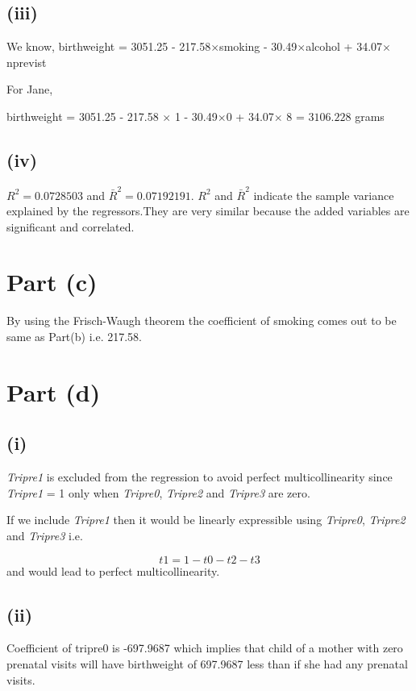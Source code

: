\documentclass{./solution}
\begin{document}
\begin{solution}
            \subsection*{(iii)}
            We know,
            birthweight = 3051.25 - 217.58$\times$smoking - 30.49$\times$alcohol  + 34.07$\times$nprevist

            For Jane,

            birthweight = 3051.25 - 217.58 $\times$ 1 - 30.49$\times$0  + 34.07$\times$ 8 = $3106.228 $ grams

            \subsection*{(iv)}
            $R^{2} = 0.0728503$ and $\bar{R}^{2}=0.07192191$.
            $R^{2}$ and $\bar{R}^{2}$  indicate the sample variance explained
            by the regressors.They are very similar because the added variables
            are significant and correlated.

        \section*{Part (c)}
            By using the Frisch-Waugh theorem the coefficient of smoking comes out to be same as Part(b) i.e. 217.58.

        \section*{Part (d)}
            \subsection*{(i)}
            \textit{Tripre1} is excluded from the regression to avoid perfect
            multicollinearity since \textit{Tripre1} = 1 only when  \textit{Tripre0},  \textit{Tripre2} and  \textit{Tripre3} are zero.

            If we include \textit{Tripre1} then it would be linearly expressible
            using \textit{Tripre0},  \textit{Tripre2} and  \textit{Tripre3} i.e.

            \[ t1 = 1 - t0 -t2 -t3 \] and would lead to perfect multicollinearity.

            \subsection*{(ii)}
            Coefficient of tripre0 is -697.9687 which implies that child of a mother
            with zero prenatal visits will have birthweight of 697.9687 less than if she had any prenatal visits.


\end{solution}
\end{document}
